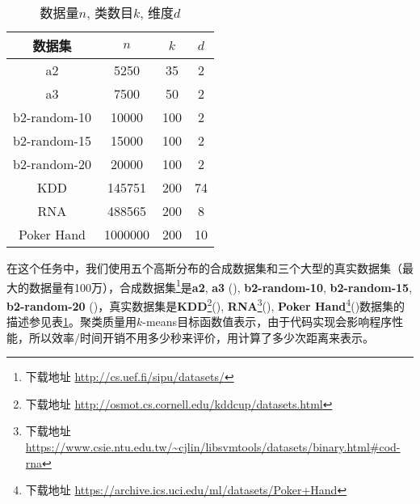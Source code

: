 \begin{table}[h]
	\caption{数据量$n$, 类数目$k$, 维度$d$}
	\label{tab:datasets}
	\begin{tabular}{cccc}
		\toprule
		数据集 & $n$ & $k$ & $d$ \\
		\midrule
		a2 & 5250 & 35 & 2 \\
		a3 & 7500 & 50 & 2 \\
		b2-random-10 & 10000 & 100 & 2 \\
		b2-random-15 & 15000 & 100 & 2 \\
		b2-random-20 & 20000 & 100 & 2 \\
		\midrule
		KDD & 145751 & 200 & 74 \\
		RNA & 488565 & 200 & 8 \\
		Poker Hand & 1000000 & 200 & 10 \\
		\bottomrule
	\end{tabular}
\end{table}

在这个任务中，我们使用五个高斯分布的合成数据集和三个大型的真实数据集（最大的数据量有100万），合成数据集\footnote{下载地址 \url{http://cs.uef.fi/sipu/datasets/}}是\textbf{a2}, \textbf{a3} (\cite{Asets}), \textbf{b2-random-10}, \textbf{b2-random-15}, \textbf{b2-random-20} (\cite{Birchsets})，真实数据集是\textbf{KDD}\footnote{下载地址 \url{http://osmot.cs.cornell.edu/kddcup/datasets.html}}(\cite{foussette2004kdd}), \textbf{RNA}\footnote{下载地址 \url{https://www.csie.ntu.edu.tw/~cjlin/libsvmtools/datasets/binary.html\#cod-rna}}(\cite{uzilov2006detection}), \textbf{Poker Hand}\footnote{下载地址 \url{https://archive.ics.uci.edu/ml/datasets/Poker+Hand}}(\cite{cattral2002evolutionary})数据集的描述参见表\ref{tab:datasets}。聚类质量用$k$-means目标函数值表示，由于代码实现会影响程序性能，所以效率/时间开销不用多少秒来评价，用计算了多少次距离来表示。

